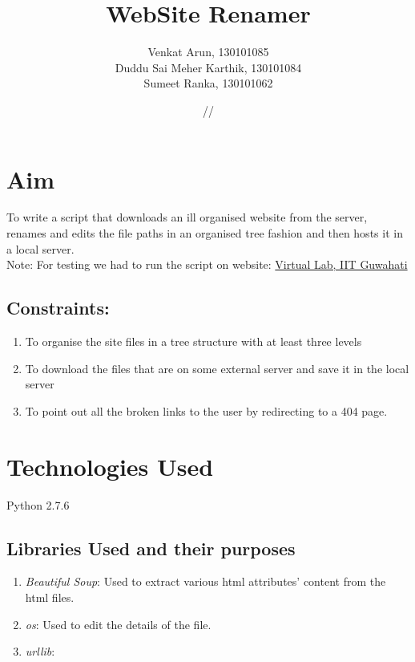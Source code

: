 \documentclass[11pt]{article}
\title{\textbf{WebSite Renamer}}
\author{Venkat Arun, 130101085\\Duddu Sai Meher Karthik, 130101084\\Sumeet Ranka, 130101062}
\date{\oldstylenums{04}/\oldstylenums{04}/\oldstylenums{2015}}
\begin{document}
\maketitle
 
\section{Aim}
To write a script that downloads an ill organised website from the server, renames and edits the file paths in an organised tree fashion and then hosts it in a local server.\\Note: For testing we had to run the script on website: \href{http://iitg.vlab.co.in}{Virtual Lab, IIT Guwahati}
\subsection{Constraints:}
    	
\begin{enumerate}
\item To organise the site files in a tree structure with at least three levels 
\item To download the files that are on some external server and save it in the local server
\item To point out all the broken links to the user by redirecting to a 404 page.
\end{enumerate}
\section{Technologies Used}
Python 2.7.6
\subsection{Libraries Used and their purposes}
\begin{enumerate}
\item \textit{Beautiful Soup}: Used to extract various html attributes' content from the html files.
\item \textit{os}: Used to edit the details of the file.
\item \textit{urllib}: 
\end{enumerate}
\end{document}
